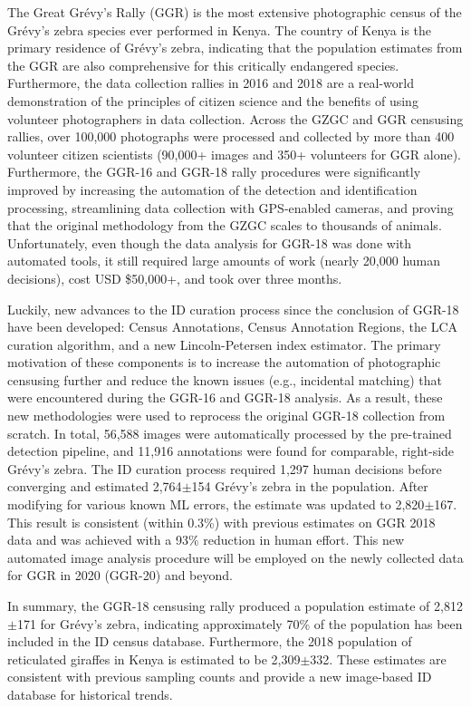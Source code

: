 The Great Gr\'evy's Rally (GGR) is the most extensive photographic census of the Gr\'evy's zebra species ever performed in Kenya.  The country of Kenya is the primary residence of Gr\'evy's zebra, indicating that the population estimates from the GGR are also comprehensive for this critically endangered species.  Furthermore, the data collection rallies in 2016 and 2018 are a real-world demonstration of the principles of citizen science and the benefits of using volunteer photographers in data collection.  Across the GZGC and GGR censusing rallies, over 100,000 photographs were processed and collected by more than 400 volunteer citizen scientists (90,000+ images and 350+ volunteers for GGR alone).  Furthermore, the GGR-16 and GGR-18 rally procedures were significantly improved by increasing the automation of the detection and identification processing, streamlining data collection with GPS-enabled cameras, and proving that the original methodology from the GZGC scales to thousands of animals.  Unfortunately, even though the data analysis for GGR-18 was done with automated tools, it still required large amounts of work (nearly 20,000 human decisions), cost USD \$50,000+, and took over three months.

Luckily, new advances to the ID curation process since the conclusion of GGR-18 have been developed: Census Annotations, Census Annotation Regions, the LCA curation algorithm, and a new Lincoln-Petersen index estimator.  The primary motivation of these components is to increase the automation of photographic censusing further and reduce the known issues (e.g., incidental matching) that were encountered during the GGR-16 and GGR-18 analysis.  As a result, these new methodologies were used to reprocess the original GGR-18 collection from scratch.  In total, 56,588 images were automatically processed by the pre-trained detection pipeline, and 11,916 annotations were found for comparable, right-side Gr\'evy's zebra.  The ID curation process required 1,297 human decisions before converging and estimated 2,764$\pm$154 Gr\'evy's zebra in the population.  After modifying for various known ML errors, the estimate was updated to 2,820$\pm$167.  This result is consistent (within 0.3\%) with previous estimates on GGR 2018 data and was achieved with a 93\% reduction in human effort.  This new automated image analysis procedure will be employed on the newly collected data for GGR in 2020 (GGR-20) and beyond.

In summary, the GGR-18 censusing rally produced a population estimate of 2,812$\pm$171 for Gr\'evy's zebra, indicating approximately 70\% of the population has been included in the ID census database.  Furthermore, the 2018 population of reticulated giraffes in Kenya is estimated to be 2,309$\pm$332.  These estimates are consistent with previous sampling counts and provide a new image-based ID database for historical trends.

